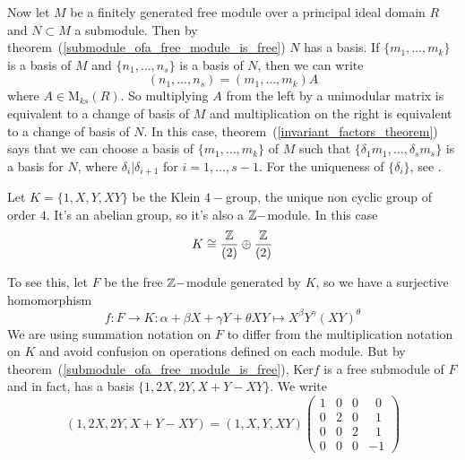 Now let $M$ be a finitely generated free module over a principal ideal domain $R$ and $N\subset M$ a submodule. Then by theorem~(\ref{submodule_ofa_free_module_is_free}) $N$ has a basis. If $\{m_1,\dots,m_k\}$ is a basis of $M$ and $\{n_1,\dots,n_s\}$ is a basis of $N$, then we can write 
\begin{equation}
    (n_1,\dots,n_s)=(m_1,\dots,m_k)A
\end{equation}
where $A\in \text{M}_{ks}(R)$. So multiplying $A$ from the left by a unimodular matrix is equivalent to a change of basis of $M$ and multiplication on the right is equivalent to a change of basis of $N$. In this case, theorem~(\ref{invariant_factors_theorem}) says that we can choose a basis of $\{m_1,\dots,m_k\}$ of $M$ such that $\{\delta_1m_1,\dots,\delta_sm_s\}$ is a basis for $N$, where $\delta_i|\delta_{i+1}$ for $i=1,\dots,s-1$. For the uniqueness of $\{\delta_i\}$, see \cite{curtis1966representation}.
\begin{dang}
    \begin{example}\label{Klein_4group_example}
        Let $K=\{1,X,Y,XY\}$ be the Klein $4-$group, the unique non cyclic group of order $4$. It's an abelian group, so it's also a $\mathbb{Z}-$module. In this case
        \begin{equation}
            K\cong \frac{\mathbb{Z}}{(2)}\oplus\frac{\mathbb{Z}}{(2)}
        \end{equation}
    \end{example}
\end{dang}
 To see this, let $F$ be the free $\mathbb{Z}-$module generated by $K$, so we have a surjective homomorphism
        \begin{equation}
             f:F\rightarrow K: \alpha+\beta X+\gamma Y+\theta XY\mapsto X^\beta Y^\gamma (XY)^\theta
        \end{equation}
        We are using summation notation on $F$ to differ from the multiplication notation on $K$ and avoid confusion on operations defined on each module. But by theorem~(\ref{submodule_ofa_free_module_is_free}), Ker$f$ is a free submodule of $F$ and in fact, has a basis $\{1,2X,2Y,X+Y-XY\}$. We write
        \begin{equation}
            (1,2X,2Y,X+Y-XY)=(1,X,Y,XY)\begin{pmatrix}
                1 & 0 & 0 & \;\;0 \\
                0 & 2 & 0 & \;\;1\\
                0 & 0 & 2 & \;\;1\\
                0 & 0 & 0 & -1
            \end{pmatrix}
        \end{equation}
